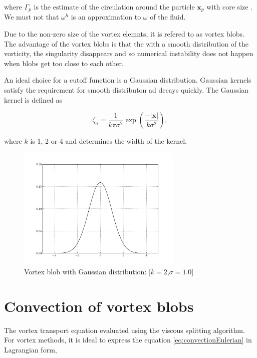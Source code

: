where $\Gamma_p$  is the estimate of the circulation around the particle $\mathbf{x}_p$  with core size . We must not that $\omega^h$ is an approximation to $\omega$ of the fluid.

Due to the non-zero size of the vortex elemnts, it is refered to as vortex blobs. The advantage of the vortex blobs is that the with a smooth distribution of the vorticity, the singularity disappears and so numerical instability does not happen when blobs get too close to each other. 

An ideal choice for a cutoff function is a Gaussian distribution. Gaussian kernels satisfy the requirement for smooth distributon ad decays quickly. The Gaussian kernel is defined as

\begin{equation}
\zeta_{\sigma} = \frac{1}{k\pi\sigma^2}\exp\left(\frac{-\left|\mathbf{x}\right|}{k\sigma^2}\right),
\end{equation}

where $k$ is 1, 2 or 4 and determines the width of the kernel.

\begin{figure}
	\centering
	\includegraphics[width=0.7\textwidth]{figures/theory/gaussianKernel.pdf}
	\caption{Vortex blob with Gaussian distribution: [$k=2$,$\sigma=1.0$]}
\end{figure}


\section{Convection of vortex blobs}

The vortex transport equation evaluated using the viscous splitting algorithm. For vortex methods, it is ideal to express the equation \ref{eq:convectionEulerian} in Lagrangian form,

